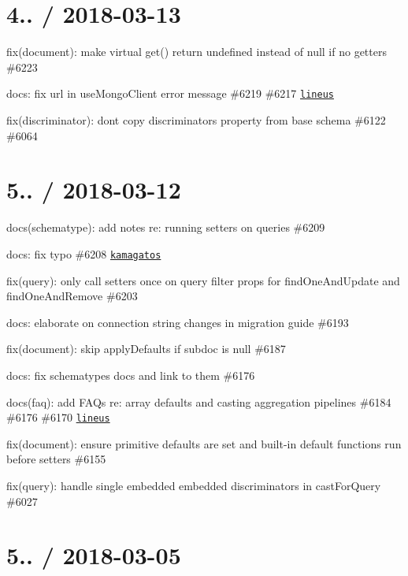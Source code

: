 \section*{4.. / 2018-\/03-\/13 }


\begin{DoxyItemize}
\item fix(document)\+: make virtual get() return undefined instead of null if no getters \#6223
\item docs\+: fix url in use\+Mongo\+Client error message \#6219 \#6217 \href{https://github.com/lineus}{\tt lineus}
\item fix(discriminator)\+: don\textquotesingle{}t copy {\ttfamily discriminators} property from base schema \#6122 \#6064
\end{DoxyItemize}

\section*{5.. / 2018-\/03-\/12 }


\begin{DoxyItemize}
\item docs(schematype)\+: add notes re\+: running setters on queries \#6209
\item docs\+: fix typo \#6208 \href{https://github.com/kamagatos}{\tt kamagatos}
\item fix(query)\+: only call setters once on query filter props for find\+One\+And\+Update and find\+One\+And\+Remove \#6203
\item docs\+: elaborate on connection string changes in migration guide \#6193
\item fix(document)\+: skip apply\+Defaults if subdoc is null \#6187
\item docs\+: fix schematypes docs and link to them \#6176
\item docs(faq)\+: add F\+A\+Qs re\+: array defaults and casting aggregation pipelines \#6184 \#6176 \#6170 \href{https://github.com/lineus}{\tt lineus}
\item fix(document)\+: ensure primitive defaults are set and built-\/in default functions run before setters \#6155
\item fix(query)\+: handle single embedded embedded discriminators in cast\+For\+Query \#6027
\end{DoxyItemize}

\section*{5.. / 2018-\/03-\/05 }


